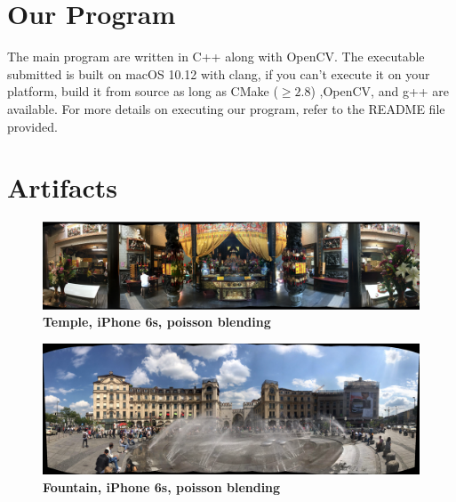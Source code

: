 \documentclass[a4paper]{article}
\begin{document}
\section{Our Program}
The main program are written in C++ along with OpenCV. The executable submitted is built on macOS 10.12 with clang, if you can't execute it on your platform, build it from source as long as CMake ($\ge 2.8$) ,OpenCV, and g++ are available. For more details on executing our program, refer to the README file provided.

\section{Artifacts}
\begin{figure}[h]
  \includegraphics[width=\textwidth]{./figs/poisson8.png}
  \caption{\bf Temple, iPhone 6s, poisson blending}
\end{figure}
\begin{figure}[h]
  \includegraphics[width=\textwidth]{./figs/poisson9.png}
  \caption{\bf Fountain, iPhone 6s, poisson blending}
\end{figure}



\end{document}
